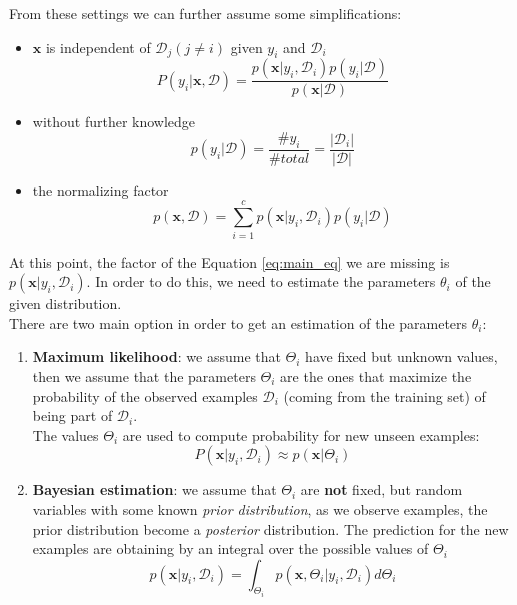 From these settings we can further assume some simplifications: 
\begin{itemize}
    \item $\pmb{x}$ is independent of $\mathcal{D}_j (j \neq i)$ given $y_i$ and $\mathcal{D}_i$
    $$P(y_i|\pmb{x}, \mathcal{D}) = \frac{p(\pmb{x}|y_i, \mathcal{D}_i)p(y_i|\mathcal{D})}{p(\pmb{x}|\mathcal{D})}$$
    \item without further knowledge
    $$p(y_i | \mathcal{D}) = \frac{\#y_i}{\#total} = \frac{|\mathcal{D}_i|}{|\mathcal{D}|}$$
    \item the normalizing factor $$p(\pmb{x}, \mathcal{D}) = \sum_{i=1}^c p(\pmb{x}|y_i, \mathcal{D}_i)p(y_i|\mathcal{D})$$
\end{itemize}

At this point, the factor of the Equation \ref{eq:main_eq} we are missing is $p(\pmb{x}|y_i, \mathcal{D}_i)$. In order to do this, we need to estimate the parameters $\theta_i$ of the given distribution.\\
There are two main option in order to get an estimation of the parameters $\theta_i$:
\begin{enumerate}
    \item \textbf{Maximum likelihood}: we assume that $\Theta_i$ have fixed but unknown values, then we assume that the parameters $\Theta_i$ are the ones that maximize the probability of the observed examples $\mathcal{D}_i$ (coming from the training set) of being part of $\mathcal{D}_i$.\\
    The values $\Theta_i$ are used to compute probability for new unseen examples:
    $$P(\pmb{x}|y_i, \mathcal{D}_i) \approx p(\pmb{x}|\Theta_i)$$
    \item \textbf{Bayesian estimation}: we assume that $\Theta_i$ are \textbf{not} fixed, but random variables with some known \textit{prior distribution}, as we observe examples, the prior distribution become a \textit{posterior} distribution. The prediction for the new examples are obtaining by an integral over the possible values of $\Theta_i$
    $$p(\pmb{x}|y_i, \mathcal{D}_i) = \int_{\Theta_i} p(\pmb{x}, \Theta_i|y_i, \mathcal{D}_i) d\Theta_i$$
\end{enumerate}

